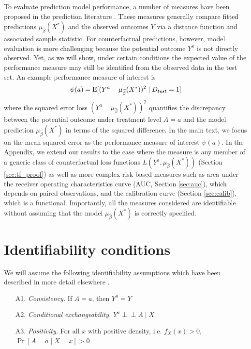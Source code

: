 To evaluate prediction model performance, a number of measures have been proposed in the prediction literature \cite{harrell_multivariable_1996, altman_what_2000, steyerberg_clinical_2019}. These measures generally compare fitted predictions $\mu_{\widehat{\beta}}(X^*)$ and the observed outcomes $Y$ via a distance function and associated sample statistic. For counterfactual predictions, however, model evaluation is more challenging because the potential outcome $Y^a$ is not directly observed. Yet, as we will show, under certain conditions the expected value of the performance measure may still be identified from the observed data in the test set. An example performance measure of interest is 
\begin{equation*}
    \psi(a) = \operatorname{E}[(Y^a - \mu_{\widehat{\beta}}(X^*))^2 \mid D_{test} = 1]
\end{equation*}
where the squared error loss $(Y^a - \mu_{\widehat{\beta}}(X^*))^2$ quantifies the discrepancy between the potential outcome under treatment level $A = a$ and the model prediction $\mu_{\widehat{\beta}}(X^*)$ in terms of the squared difference. In the main text, we focus on the mean squared error as the performance measure of interest $\psi(a)$. In the Appendix, we extend our results to the case where the measure is any member of a generic class of counterfactual loss functions $L(Y^a,  \mu_{\widehat{\beta}}(X^*))$ (Section \ref{sec:tf_proof}) as well as more complex risk-based measures such as area under the receiver operating characteristics curve (AUC, Section \ref{sec:auc}), which depends on paired observations, and the calibration curve (Section \ref{sec:calib}), which is a functional. Importantly, all the measures considered are identifiable without assuming that the model $\mu_{\widehat{\beta}}(X^*)$ is correctly specified.

\section{Identifiability conditions} \label{sec:identifiability}
We will assume the following identifiability assumptions which have been described in more detail elsewhere \cite{hernan_causal_2020, robins_new_1986, robins_graphical_1987}.

\begin{enumerate}
    \item[A1.] \textit{Consistency.} If $A = a$, then $Y^a = Y$ 
    \item[A2.] \textit{Conditional exchangeability.} $Y^a \perp\!\!\!\perp A \mid X$ 
    \item[A3.] \textit{Positivity.} For all $x$ with positive density, i.e. $f_X(x) > 0$, $\Pr[A = a \mid X = x] > 0$ 
\end{enumerate}


